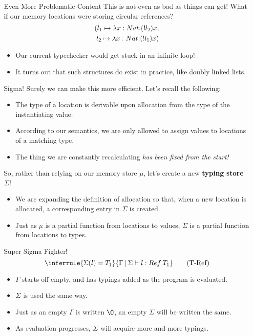 \documentclass[11pt]{beamer}
\begin{document}
\begin{frame}[fragile=singleslide]{Even More Problematic Content}
This is not even as bad as things can get! What if our memory locations were storing circular references?  
\begin{align*}
(\mathnormal{l}_1 \mapsto \lambda x:Nat. (!\mathnormal{l}_2) x, \\
\mathnormal{l}_2 \mapsto \lambda x:Nat. (!\mathnormal{l}_1) x  ) 
\end{align*}
\begin{itemize}
\item Our current typechecker would get stuck in an infinite loop!  
\item It turns out that such structures do exist in practice, like doubly linked lists.  
\end{itemize}

\end{frame}


\begin{frame}[fragile=singleslide]{Sigma!}
Surely we can make this more efficient.  Let's recall the following:
\begin{itemize}
\item The type of a location is derivable upon allocation from the type of the instantiating value.
\item According to our semantics, we are only allowed to assign values to locations of a matching type.  
\item The thing we are constantly recalculating \emph{has been fixed from the start!}
\end{itemize}
So, rather than relying on our memory store $\mu$, let's create a new \textbf{typing store} $\Sigma$!
\begin{itemize}
\item We are expanding the definition of allocation so that, when a new location is allocated, a corresponding entry in $\Sigma$ is created.
\item Just as $\mu$ is a partial function from locations to values, $\Sigma$ is a partial function from locations to types.
\end{itemize}
\end{frame}


\begin{frame}[fragile=singleslide]{Super Sigma Fighter!}
\begin{equation}
\inferrule{\Sigma(\mathnormal{l}) = T_1}{\Gamma\:|\:\Sigma \vdash \mathnormal{l} : Ref\:T_1} \tag{T-Ref}
\end{equation}
\begin{itemize}
\item $\Gamma$ starts off empty, and has typings added as the program is evaluated.
\item $\Sigma$ is used the same way. 
\item Just as an empty $\Gamma$ is written $\O$, an empty $\Sigma$ will be written the same.
\item As evaluation progresses, $\Sigma$ will acquire more and more typings.
\end{itemize}
\end{frame}
\end{document}
